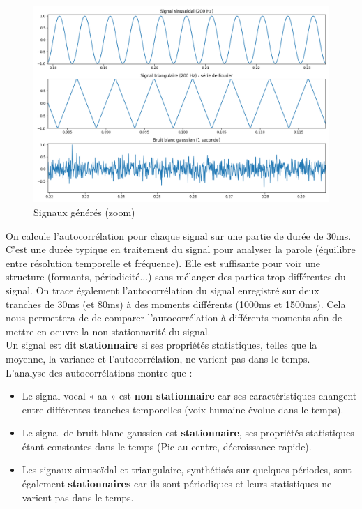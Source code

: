 \begin{figure}[!h]
\centering
\includegraphics[width=17cm]{screenshots/generation_signaux_zoom.png}
\caption{Signaux générés (zoom)} 
\end{figure} 

\newpage

On calcule l'autocorrélation pour chaque signal sur une partie de durée de 30ms. C’est une durée typique en traitement du signal pour analyser la parole (équilibre entre résolution temporelle et fréquence). Elle est suffisante pour voir une structure (formants, périodicité...) sans mélanger des parties trop différentes du signal. On trace également l'autocorrélation du signal enregistré sur deux tranches de 30ms (et 80ms) à des moments différents (1000ms et 1500ms). Cela nous permettera de de comparer l'autocorrélation à différents moments afin de mettre en oeuvre la non-stationnarité du signal.\\

Un signal est dit \textbf{stationnaire} si ses propriétés statistiques, telles que la moyenne, la variance et l'autocorrélation, ne varient pas dans le temps.\\

L'analyse des autocorrélations montre que :
\begin{itemize}
    \item Le signal vocal « aa » est \textbf{non stationnaire} car ses caractéristiques changent entre différentes tranches temporelles (voix humaine évolue dans le temps).
    \item Le signal de bruit blanc gaussien est \textbf{stationnaire}, ses propriétés statistiques étant constantes dans le temps (Pic au centre, décroissance rapide).
    \item Les signaux sinusoïdal et triangulaire, synthétisés sur quelques périodes, sont également \textbf{stationnaires} car ils sont périodiques et leurs statistiques ne varient pas dans le temps.
\end{itemize}

